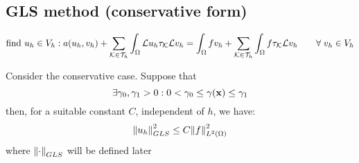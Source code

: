 \subsection{GLS method (conservative form)}
\[
    \text{find } u_h \in V_h : a(u_h, v_h) + \sum_{\mathcal{K} \in \mathcal{T}_h} \int_\Omega \mathcal{L}u_h \tau_{\mathcal{K}} \mathcal{L}v_h = \int_\Omega f v_h + \sum_{\mathcal{K} \in \mathcal{T}_h} \int_\Omega f \tau_{\mathcal{K}} \mathcal{L}v_h \qquad \forall \; v_h \in V_h
\]
\begin{theorem}
    Consider the conservative case. Suppose that 
    \[
        \exists \gamma_0 , \gamma_1 > 0 : 0 < \gamma_0 \leq \gamma(\textbf{x}) \leq \gamma_1
    \]
    then, for a suitable constant \(C\), independent of \(h\), we have:
    \[
        \norm{u_h}_{GLS}^2 \leq C \norm{f}_{L^2(\Omega)}^2
    \]
    where \(\norm{\cdot}_{GLS}\) will be defined later
\end{theorem}
